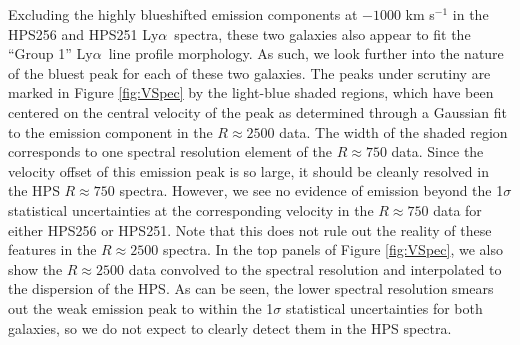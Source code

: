 \documentclass{emulateapj}
\newcommand{\lya}{Ly$\alpha$}
\begin{document}
Excluding the highly blueshifted emission components at $-1000$ km s$^{-1}$ in the HPS256 and HPS251 \lya\ spectra, these two galaxies also appear to fit the ``Group 1'' \lya\ line profile morphology. As such, we look further into the nature of the bluest peak for each of these two galaxies. The peaks under scrutiny are marked in Figure \ref{fig:VSpec} by the light-blue shaded regions, which have been centered on the central velocity of the peak as determined through a Gaussian fit to the emission component in the $R\approx2500$ data. The width of the shaded region corresponds to one spectral resolution element of the $R\approx750$ data. Since the velocity offset of this emission peak is so large, it should be cleanly resolved in the HPS $R\approx750$ spectra. However, we see no evidence of emission beyond the 1$\sigma$ statistical uncertainties at the corresponding velocity in the $R\approx750$ data for either HPS256 or HPS251. Note that this does not rule out the reality of these features in the $R\approx2500$ spectra. In the top panels of Figure \ref{fig:VSpec}, we also show the $R\approx2500$ data convolved to the spectral resolution and interpolated to the dispersion of the HPS. As can be seen, the lower spectral resolution smears out the weak emission peak to within the 1$\sigma$ statistical uncertainties for both galaxies, so we do not expect to clearly detect them in the HPS spectra.
\end{document}
